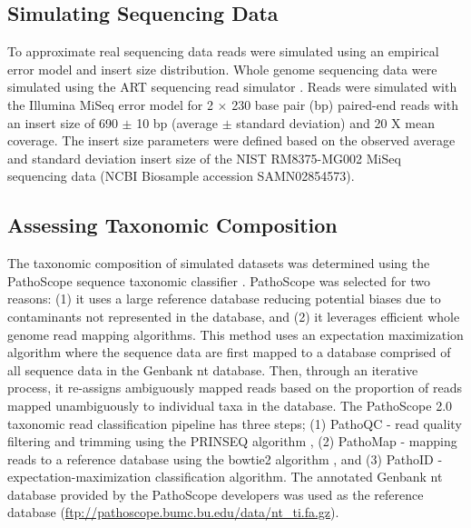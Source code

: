 \documentclass[fleqn,10pt,lineno]{wlpeerj}\usepackage[]{graphicx}\usepackage[]{color}
\begin{document}
\subsection*{Simulating Sequencing Data}
To approximate real sequencing data reads were simulated using an empirical error model and insert size distribution.
Whole genome sequencing data were simulated using the ART sequencing read simulator \citep{Huang2012}.
Reads were simulated with the Illumina MiSeq error model for 2 $\times$ 230 base pair (bp) paired-end reads with an insert size of 690 $\pm$ 10 bp (average $\pm$ standard deviation) and 20 X mean coverage.
The insert size parameters were defined based on the observed average and standard deviation insert size of the NIST RM8375-MG002 MiSeq sequencing data \citep{olson2016pepr} (NCBI Biosample accession SAMN02854573).

\subsection*{Assessing Taxonomic Composition}
The taxonomic composition of simulated datasets was determined using the PathoScope sequence taxonomic classifier \citep{Francis2013}.
PathoScope was selected for two reasons: (1) it uses a large reference database reducing potential biases due to contaminants not represented in the database, and (2) it leverages efficient whole genome read mapping algorithms.
This method uses an expectation maximization algorithm where the sequence data are first mapped to a database comprised of all sequence data in the Genbank nt database.
Then, through an iterative process, it re-assigns ambiguously mapped reads based on the proportion of reads mapped unambiguously to individual taxa in the database.
The PathoScope 2.0 taxonomic read classification pipeline has three steps; (1) PathoQC - read quality filtering and trimming using the PRINSEQ algorithm \citep{schmieder2011quality}, (2) PathoMap - mapping reads to a reference database using the bowtie2 algorithm \citep{Langmead2012}, and (3) PathoID - expectation-maximization classification algorithm.
The annotated Genbank nt database provided by the PathoScope developers was used as the reference database (\url{ftp://pathoscope.bumc.bu.edu/data/nt\_ti.fa.gz}).
\end{document}
